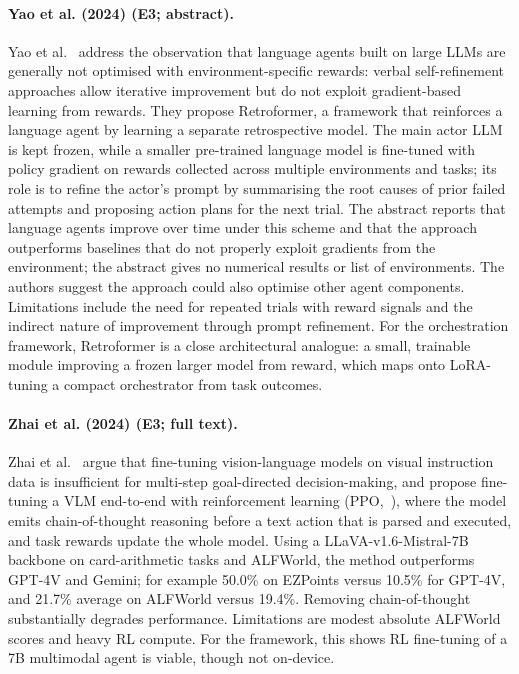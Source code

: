 \documentclass[10pt,a4paper]{article}
\begin{document}
\paragraph{Yao et al. (2024) (E3; abstract).} Yao et al.~\cite{Yao2024} address the observation that language agents built on large LLMs are generally not optimised with environment-specific rewards: verbal self-refinement approaches allow iterative improvement but do not exploit gradient-based learning from rewards. They propose Retroformer, a framework that reinforces a language agent by learning a separate retrospective model. The main actor LLM is kept frozen, while a smaller pre-trained language model is fine-tuned with policy gradient on rewards collected across multiple environments and tasks; its role is to refine the actor's prompt by summarising the root causes of prior failed attempts and proposing action plans for the next trial. The abstract reports that language agents improve over time under this scheme and that the approach outperforms baselines that do not properly exploit gradients from the environment; the abstract gives no numerical results or list of environments. The authors suggest the approach could also optimise other agent components. Limitations include the need for repeated trials with reward signals and the indirect nature of improvement through prompt refinement. For the orchestration framework, Retroformer is a close architectural analogue: a small, trainable module improving a frozen larger model from reward, which maps onto LoRA-tuning a compact orchestrator from task outcomes.

\paragraph{Zhai et al. (2024) (E3; full text).} Zhai et al.~\cite{Zhai2024} argue that fine-tuning vision-language models on visual instruction data is insufficient for multi-step goal-directed decision-making, and propose fine-tuning a VLM end-to-end with reinforcement learning (PPO,~\cite{Schulman2017}), where the model emits chain-of-thought reasoning before a text action that is parsed and executed, and task rewards update the whole model. Using a LLaVA-v1.6-Mistral-7B backbone on card-arithmetic tasks and ALFWorld, the method outperforms GPT-4V and Gemini; for example 50.0\% on EZPoints versus 10.5\% for GPT-4V, and 21.7\% average on ALFWorld versus 19.4\%. Removing chain-of-thought substantially degrades performance. Limitations are modest absolute ALFWorld scores and heavy RL compute. For the framework, this shows RL fine-tuning of a 7B multimodal agent is viable, though not on-device.
\end{document}
